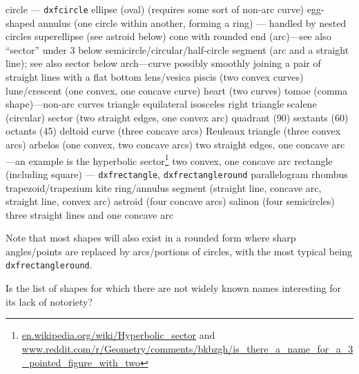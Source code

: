 \documentclass{ltxdoc}
\begin{document}
\begin{outline}
   \2 circle --- \verb|dxfcircle|
   \2 ellipse (oval) (requires some sort of non-arc curve)
      \3 egg-shaped
   \2 annulus (one circle within another, forming  a ring) --- handled by nested circles
   \2 superellipse (see astroid below)
   \2 cone with rounded end (arc)---see also ``sector'' under 3 below
   \2 semicircle/circular/half-circle segment (arc and a straight line); see also sector below
   \2 arch---curve possibly smoothly joining a  pair of straight lines with a flat bottom
   \2 lens/vesica piscis (two convex curves)
   \2 lune/crescent (one convex, one concave  curve)
   \2 heart (two curves)
   \2 tomoe (comma shape)---non-arc curves
   \2 triangle
      \3 equilateral
      \3 isosceles
      \3 right triangle
      \3 scalene
   \2 (circular) sector (two straight edges, one convex arc)
      \3 quadrant (90\textdegree)
      \3 sextants (60\textdegree)
      \3 octants (45\textdegree)
   \2 deltoid curve (three concave arcs)
   \2  Reuleaux triangle (three convex arcs)
   \2 arbelos (one convex, two concave arcs)
   \2 two straight edges, one concave arc---an example is the hyperbolic sector\footnote{\url{en.wikipedia.org/wiki/Hyperbolic_sector} and
 \url{www.reddit.com/r/Geometry/comments/bkbzgh/is_there_a_name_for_a_3_pointed_figure_with_two}}
   \2 two convex, one concave arc
   \2 rectangle (including square) --- \verb|dxfrectangle|, \verb|dxfrectangleround|
   \2 parallelogram
   \2 rhombus
   \2 trapezoid/trapezium
   \2 kite
   \2 ring/annulus segment (straight line, concave arc, straight line, convex arc)
   \2 astroid (four concave arcs)
   \2 salinon (four semicircles)
   \2 three straight lines and one concave arc
\end{outline}

Note that most shapes will also exist in a rounded form where sharp angles/points are replaced by arcs/portions of circles, with the most typical being \verb|dxfrectangleround|.

Is the list of shapes for which there are not widely known names interesting for its lack of notoriety?
\end{document}
